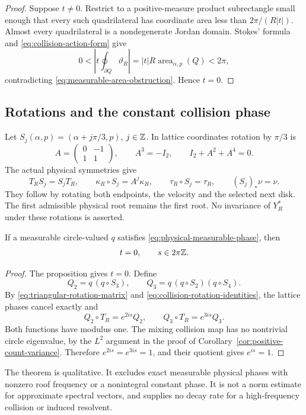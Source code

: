 \begin{proof}
Suppose $t\ne0$. Restrict to a positive-measure product subrectangle
small enough that every such quadrilateral has coordinate area less
than $2\pi/(R|t|)$. Almost every quadrilateral is a nondegenerate Jordan
domain. Stokes' formula and \eqref{eq:collision-action-form} give
\[
 0<\left|t\oint_{\partial Q}\vartheta_R\right|
       =|t|R\operatorname{area}_{\alpha,p}(Q)<2\pi,
\]
contradicting \eqref{eq:measurable-area-obstruction}. Hence $t=0$.
\end{proof}

\subsection{Rotations and the constant collision phase}
Let $S_j(\alpha,p)=(\alpha+j\pi/3,p)$, $j\in\mathbb Z$. In lattice
coordinates rotation by $\pi/3$ is
\begin{equation}\label{eq:triangular-rotation-matrix}
 A=\begin{pmatrix}0&-1\\1&1\end{pmatrix},\qquad
 A^3=-I_2,\qquad I_2+A^2+A^4=0.
\end{equation}
The actual physical symmetries give
\begin{equation}\label{eq:collision-rotation-identities}
 T_RS_j=S_jT_R,\qquad
 \kappa_R\circ S_j=A^j\kappa_R,\qquad
 \tau_R\circ S_j=\tau_R,\qquad (S_j)_*\nu=\nu.
\end{equation}
They follow by rotating both endpoints, the velocity and the selected
next disk. The first admissible physical root remains the first root.
No invariance of $Y_R^*$ under these rotations is asserted.

\begin{theorem}
\label{thm:physical-phase-rigidity}
If a measurable circle-valued $q$ satisfies
\eqref{eq:physical-measurable-phase}, then
\begin{equation}\label{eq:physical-phase-conclusion}
 t=0,\qquad s\in2\pi\mathbb Z.
\end{equation}
\end{theorem}
\begin{proof}
The proposition gives $t=0$. Define
\[
 Q_2=q\,(q\circ S_3),\qquad
 Q_3=q\,(q\circ S_2)(q\circ S_4).
\]
By \eqref{eq:triangular-rotation-matrix} and
\eqref{eq:collision-rotation-identities}, the lattice phases cancel
exactly and
\[
 Q_2\circ T_R=e^{2is}Q_2,\qquad Q_3\circ T_R=e^{3is}Q_3.
\]
Both functions have modulus one. The mixing collision map has no
nontrivial circle eigenvalue, by the $L^2$ argument in the proof of
Corollary~\ref{cor:positive-count-variance}. Therefore
$e^{2is}=e^{3is}=1$, and their quotient gives $e^{is}=1$.
\end{proof}

The theorem is qualitative. It excludes exact measurable physical
phases with nonzero roof frequency or a nonintegral constant phase.
It is not a norm estimate for approximate spectral vectors, and supplies
no decay rate for a high-frequency collision or induced resolvent.
